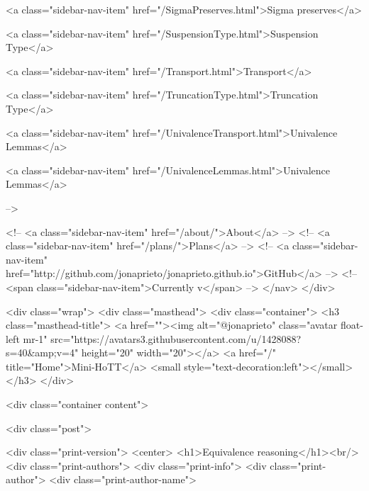       
        
          <a class="sidebar-nav-item" href="/SigmaPreserves.html">Sigma preserves</a>
        
      
    
      
        
          <a class="sidebar-nav-item" href="/SuspensionType.html">Suspension Type</a>
        
      
    
      
        
          <a class="sidebar-nav-item" href="/Transport.html">Transport</a>
        
      
    
      
        
          <a class="sidebar-nav-item" href="/TruncationType.html">Truncation Type</a>
        
      
    
      
        
          <a class="sidebar-nav-item" href="/UnivalenceTransport.html">Univalence Lemmas</a>
        
      
    
      
        
          <a class="sidebar-nav-item" href="/UnivalenceLemmas.html">Univalence Lemmas</a>
        
      
     -->

    <!-- <a class="sidebar-nav-item" href="/about/">About</a> -->
    <!-- <a class="sidebar-nav-item" href="/plans/">Plans</a> -->
    <!-- <a class="sidebar-nav-item" href="http://github.com/jonaprieto/jonaprieto.github.io">GitHub</a> -->
    <!-- <span class="sidebar-nav-item">Currently v</span> -->
  </nav>
</div>

    <div class="wrap">
      <div class="masthead">
        <div class="container">
          <h3 class="masthead-title">
            <a href=""><img alt="@jonaprieto" class="avatar float-left mr-1" src="https://avatars3.githubusercontent.com/u/1428088?s=40&amp;v=4" height="20" width="20"></a>
            <a href="/" title="Home">Mini-HoTT</a>
            <small style="text-decoration:left"></small>
          </h3>
        </div>
      
      <div class="container content">
        







<div class="post">

  <div class="print-version">
    <center>
      <h1>Equivalence reasoning</h1><br/>
        <div class="print-authors">
          <div class="print-info">
            <div class="print-author">
              <div class="print-author-name">
                
